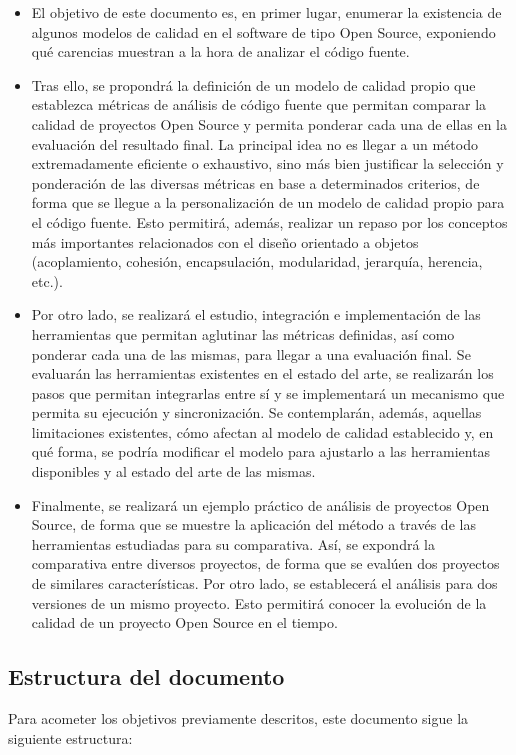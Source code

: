 \documentclass[11pt]{article}
\begin{document}
\begin{itemize}
\item{El objetivo de este documento es, en primer lugar, enumerar la existencia de algunos modelos de calidad en el software de tipo Open Source, exponiendo qué carencias muestran a la hora de analizar el código fuente}.
\item{Tras ello, se propondrá la definición de un modelo de calidad propio que establezca métricas de análisis de código fuente que permitan comparar la calidad de proyectos Open Source y permita ponderar cada una de ellas en la evaluación del resultado final. La principal idea no es llegar a un método extremadamente eficiente o exhaustivo, sino más bien justificar la selección y ponderación de las diversas métricas en base a determinados criterios, de forma que se llegue a la personalización de un modelo de calidad propio para el código fuente. Esto permitirá, además, realizar un repaso por los conceptos más importantes relacionados con el diseño orientado a objetos (acoplamiento, cohesión, encapsulación, modularidad, jerarquía, herencia, etc.)}.
\item{Por otro lado, se realizará el estudio, integración e implementación de las herramientas que permitan aglutinar las métricas definidas, así como ponderar cada una de las mismas, para llegar a una evaluación final. Se evaluarán las herramientas existentes en el estado del arte, se realizarán los pasos que permitan integrarlas entre sí y se implementará un mecanismo que permita su ejecución y sincronización. Se contemplarán, además, aquellas limitaciones existentes, cómo afectan al modelo de calidad establecido y, en qué forma, se podría modificar el modelo para ajustarlo a las herramientas disponibles y al estado del arte de las mismas}.
\item{Finalmente, se realizará un ejemplo práctico de análisis de proyectos Open Source, de forma que se muestre la aplicación del método a través de las herramientas estudiadas para su comparativa. Así, se expondrá la comparativa entre diversos proyectos, de forma que se evalúen dos proyectos de similares características. Por otro lado, se establecerá el análisis para dos versiones de un mismo proyecto. Esto permitirá conocer la evolución de la calidad de un proyecto Open Source en el tiempo}.
\end{itemize}

\subsection{Estructura del documento}
Para acometer los objetivos previamente descritos, este documento sigue la siguiente estructura:
\end{document}
